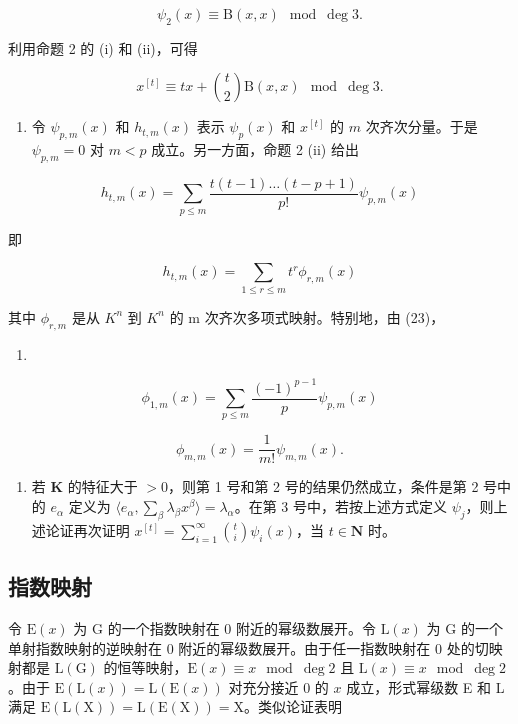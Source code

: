 \[
\psi_ {2} (x) \equiv \mathrm{B} (x, x) \mod \deg 3.\tag{21}
\]

利用命题 2 的 (i) 和 (ii)，可得

\[
x ^ {[ t ]} \equiv t x + \binom {t} {2} \mathrm{B} (x, x) \mod \deg 3.\tag{22}
\]

\begin{enumerate}
\def\labelenumi{(\arabic{enumi})}
\setcounter{enumi}{3}
\tightlist
\item
  令 \(\psi_{p,m}(x)\) 和 \(h_{t,m}(x)\) 表示 \(\psi_p(x)\) 和 \(x^{[t]}\) 的 \(m\) 次齐次分量。于是 \(\psi_{p,m} = 0\) 对 \(m < p\) 成立。另一方面，命题 2 (ii) 给出
\end{enumerate}

\[
h _ {t, m} (x) = \sum_ {p \leqslant m} \frac {t (t - 1) \dots (t - p + 1)}{p !} \psi_ {p, m} (x)\tag{23}
\]

即

\[
h _ {t, m} (x) = \sum_ {1 \leqslant r \leqslant m} t ^ {r} \phi_ {r, m} (x)\tag{24}
\]

其中 \(\phi_{r,m}\) 是从 \(K^{n}\) 到 \(K^{n}\) 的 m 次齐次多项式映射。特别地，由 (23)，

\begin{enumerate}
\def\labelenumi{(\arabic{enumi})}
\setcounter{enumi}{24}
\tightlist
\item
\end{enumerate}

\[
\phi_ {1, m} (x) = \sum_ {p \leqslant m} \frac {(- 1) ^ {p - 1}}{p} \psi_ {p, m} (x)\tag{25}
\]

\[
\phi_ {m, m} (x) = \frac {1}{m !} \psi_ {m, m} (x).\tag{26}
\]

\begin{enumerate}
\def\labelenumi{(\arabic{enumi})}
\setcounter{enumi}{4}
\tightlist
\item
  若 \(\mathbf{K}\) 的特征大于 \(>0\)，则第 1 号和第 2 号的结果仍然成立，条件是第 2 号中的 \(e_{\alpha}\) 定义为 \(\langle e_{\alpha}, \sum_{\beta} \lambda_{\beta} x^{\beta} \rangle = \lambda_{\alpha}\)。在第 3 号中，若按上述方式定义 \(\psi_j\)，则上述论证再次证明 \(x^{[t]} = \sum_{i=1}^{\infty} \binom{t}{i} \psi_i(x)\)，当 \(t \in \mathbf{N}\) 时。
\end{enumerate}

\subsection{指数映射}

令 \(\mathrm{E}(x)\) 为 G 的一个指数映射在 0 附近的幂级数展开。令 \(\mathrm{L}(x)\) 为 G 的一个单射指数映射的逆映射在 0 附近的幂级数展开。由于任一指数映射在 0 处的切映射都是 \(\mathrm{L}(\mathrm{G})\) 的恒等映射，\(\mathrm{E}(x) \equiv x \mod \deg 2\) 且 \(\mathrm{L}(x) \equiv x \mod \deg 2\)。由于 \(\mathrm{E}(\mathrm{L}(x)) = \mathrm{L}(\mathrm{E}(x))\) 对充分接近 0 的 \(x\) 成立，形式幂级数 E 和 L 满足 \(\mathrm{E}(\mathrm{L}(\mathrm{X})) = \mathrm{L}(\mathrm{E}(\mathrm{X})) = \mathrm{X}\)。类似论证表明

